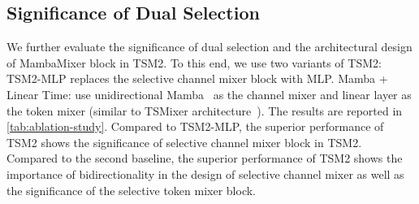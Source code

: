 \documentclass{article}
\newcommand*\circled[1]{\tikz[baseline=(char.base)]{
            \node[shape=circle,draw,inner sep=0.3pt, fill=c2] (char) {\textcolor{white}{#1}};}}
\begin{document}
\begin{table}[ht]
    \centering
        \caption{Evaluation of TSM2 and baselines on M5 dataset with auxiliary information.}
    \label{tab:auxiliary_result}
\end{table}




















\subsection{Significance of Dual Selection}
We further evaluate the significance of dual selection and the architectural design of MambaMixer block in TSM2. To this end, we use two variants of TSM2: \circled{1} TSM2-MLP replaces the selective channel mixer block with MLP. \circled{2} Mamba + Linear Time: use unidirectional Mamba~\citep{gu2023mamba} as the channel mixer and linear layer as the token mixer (similar to TSMixer architecture~\citep{chen2023tsmixer}). The results are reported in \autoref{tab:ablation-study}. Compared to TSM2-MLP, the superior performance of TSM2 shows the significance of selective channel mixer block in TSM2. Compared to the second baseline, the superior performance of TSM2 shows the importance of bidirectionality in the design of selective channel mixer as well as the significance of the selective token mixer block.  
\end{document}
